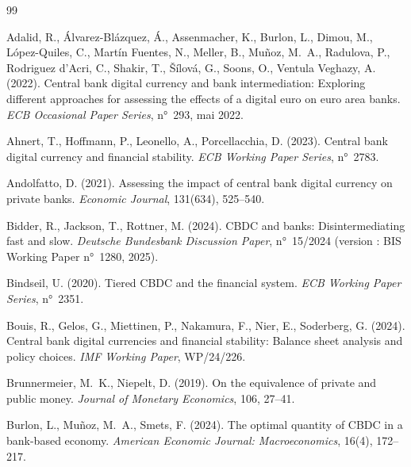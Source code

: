 \documentclass[11pt,a4paper]{article}
\begin{document}
	\begin{thebibliography}{99}
		\setlength{\itemsep}{2pt}
		
		Adalid, R., Álvarez-Blázquez, Á., Assenmacher, K., Burlon, L., Dimou, M., López-Quiles, C., Martín Fuentes, N., Meller, B., Muñoz, M.~A., Radulova, P., Rodriguez d'Acri, C., Shakir, T., Šílová, G., Soons, O., Ventula Veghazy, A. (2022).
		\newblock Central bank digital currency and bank intermediation: Exploring different approaches for assessing the effects of a digital euro on euro area banks.
		\newblock \emph{ECB Occasional Paper Series}, n°~293, mai 2022.
		
		Ahnert, T., Hoffmann, P., Leonello, A., Porcellacchia, D. (2023).
		\newblock Central bank digital currency and financial stability.
		\newblock \emph{ECB Working Paper Series}, n°~2783.
		
		Andolfatto, D. (2021).
		\newblock Assessing the impact of central bank digital currency on private banks.
		\newblock \emph{Economic Journal}, 131(634), 525--540.
		
		Bidder, R., Jackson, T., Rottner, M. (2024).
		\newblock CBDC and banks: Disintermediating fast and slow.
		\newblock \emph{Deutsche Bundesbank Discussion Paper}, n°~15/2024 (version : BIS Working Paper n°~1280, 2025).
		
		Bindseil, U. (2020).
		\newblock Tiered CBDC and the financial system.
		\newblock \emph{ECB Working Paper Series}, n°~2351.
		
		Bouis, R., Gelos, G., Miettinen, P., Nakamura, F., Nier, E., Soderberg, G. (2024).
		\newblock Central bank digital currencies and financial stability: Balance sheet analysis and policy choices.
		\newblock \emph{IMF Working Paper}, WP/24/226.
		
		Brunnermeier, M.~K., Niepelt, D. (2019).
		\newblock On the equivalence of private and public money.
		\newblock \emph{Journal of Monetary Economics}, 106, 27--41.
		
		Burlon, L., Muñoz, M.~A., Smets, F. (2024).
		\newblock The optimal quantity of CBDC in a bank-based economy.
		\newblock \emph{American Economic Journal: Macroeconomics}, 16(4), 172--217.
		

\end{thebibliography}
\end{document}
